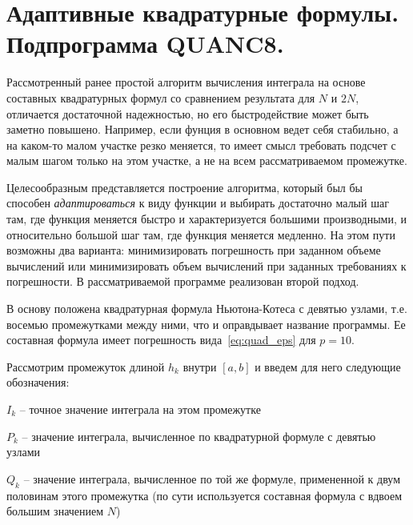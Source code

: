 \section{Адаптивные квадратурные формулы. Подпрограмма \textbf{QUANC8}.}\label{sec:ch11}
Рассмотренный ранее простой алгоритм вычисления интеграла на основе
составных квадратурных формул со сравнением результата для $N$ и $2N$,
отличается достаточной надежностью, но его быстродействие может быть
заметно повышено. Например, если фунция в основном ведет себя
стабильно, а на каком-то малом участке резко меняется, то имеет смысл
требовать подсчет с малым шагом только на этом участке, а не на всем
рассматриваемом промежутке.

Целесообразным представляется построение алгоритма, который был бы
способен \emph{адаптироваться} к виду функции и выбирать достаточно
малый шаг там, где функция меняется быстро и характеризуется большими
производными, и относительно большой шаг там, где функция меняется
медленно. На этом пути возможны два варианта: минимизировать погрешность
при заданном объеме вычислений или минимизировать объем вычислений при
заданных требованиях к погрешности. В рассматриваемой программе
реализован второй подход.

В основу положена квадратурная формула Ньютона-Котеса с девятью узлами,
т.е. восемью промежутками между ними, что и оправдывает название
программы. Ее составная формула имеет погрешность вида~\eqref{eq:quad_eps} для $p=10$.

Рассмотрим промежуток длиной $h_k$ внутри $[a, b]$ и введем для него
следующие обозначения:

$I_k$ -- точное значение интеграла на этом промежутке

$P_k$ -- значение интеграла, вычисленное по квадратурной формуле с девятью узлами

$Q_k$ -- значение интеграла, вычисленное по той же формуле, примененной к двум
половинам этого промежутка (по сути используется составная формула с вдвоем
большим значением $N$)

